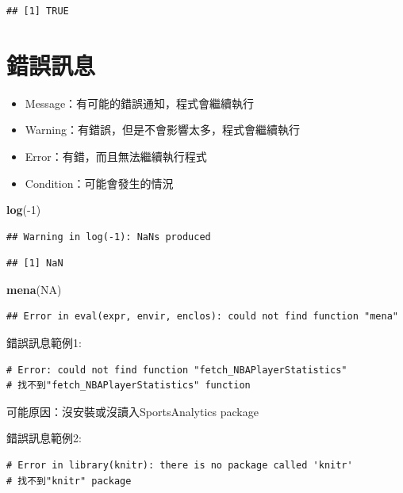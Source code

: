 \documentclass[]{book}
\newenvironment{Shaded}{\begin{snugshade}}{\end{snugshade}}
\newcommand{\KeywordTok}[1]{\textcolor[rgb]{0.13,0.29,0.53}{\textbf{{#1}}}}
\newcommand{\DecValTok}[1]{\textcolor[rgb]{0.00,0.00,0.81}{{#1}}}
\newcommand{\OtherTok}[1]{\textcolor[rgb]{0.56,0.35,0.01}{{#1}}}
\newcommand{\NormalTok}[1]{{#1}}
\providecommand{\tightlist}{%
  \setlength{\itemsep}{0pt}\setlength{\parskip}{0pt}}
\theoremstyle{definition}
\theoremstyle{definition}
\theoremstyle{remark}
\begin{document}
\begin{verbatim}
## [1] TRUE
\end{verbatim}

\section{錯誤訊息}

\begin{itemize}
\tightlist
\item
  Message：有可能的錯誤通知，程式會繼續執行
\item
  Warning：有錯誤，但是不會影響太多，程式會繼續執行
\item
  Error：有錯，而且無法繼續執行程式
\item
  Condition：可能會發生的情況
\end{itemize}

\begin{Shaded}
\begin{Highlighting}[]
\KeywordTok{log}\NormalTok{(-}\DecValTok{1}\NormalTok{)}
\end{Highlighting}
\end{Shaded}

\begin{verbatim}
## Warning in log(-1): NaNs produced
\end{verbatim}

\begin{verbatim}
## [1] NaN
\end{verbatim}

\begin{Shaded}
\begin{Highlighting}[]
\KeywordTok{mena}\NormalTok{(}\OtherTok{NA}\NormalTok{)}
\end{Highlighting}
\end{Shaded}

\begin{verbatim}
## Error in eval(expr, envir, enclos): could not find function "mena"
\end{verbatim}

錯誤訊息範例1:

\begin{verbatim}
# Error: could not find function "fetch_NBAPlayerStatistics"
# 找不到"fetch_NBAPlayerStatistics" function
\end{verbatim}

可能原因：沒安裝或沒讀入SportsAnalytics package

錯誤訊息範例2:

\begin{verbatim}
# Error in library(knitr): there is no package called 'knitr'
# 找不到"knitr" package
\end{verbatim}
\end{document}

